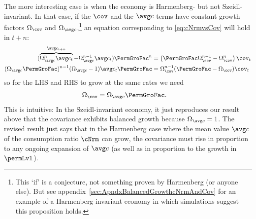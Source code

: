 \documentclass[BufferStockTheory]{subfiles}
\begin{document}
The more interesting case is when the economy is Harmenberg- but not Szeidl-invariant.
In that case, if the $\cov$ and the $\cNrmAvg$ terms have constant growth factors $\GroFac_{\cov}$ and $\GroFac_{\cNrmAvg}$,\footnote{This `if' is a conjecture, not something proven by Harmenberg (or anyone else).
But see appendix~\ref{sec:ApndxBalancedGrowthcNrmAndCov} for an example of a Harmenberg-invariant economy in which simulations suggest this proposition holds.} an equation corresponding to \eqref{eq:cNrmvsCov} will hold in $t+n$:
\begin{equation} \label{eq:aNrmGrovsCovGronm1}
  \begin{aligned}
    (\overbrace{\GroFac_{\cNrmAvg}^{n}\cNrmAvg_{t}}^{\cNrmAvg_{t+n}}-\GroFac^{n-1}_{\cNrmAvg}\cNrmAvg_{t})\PermGroFac^{n} & = \left(\PermGroFac\GroFac_{\cov}^{n-1} -\GroFac_{\cov}^{n}\right)\cov_{t}
    \\ (\GroFac_{\cNrmAvg}\PermGroFac)^{n-1} (\GroFac_{\cNrmAvg}-1)\cNrmAvg_{t}\PermGroFac & = \GroFac_{\cov}^{n-1}(\PermGroFac - \GroFac_{\cov}) \cov_{t}
  \end{aligned}
\end{equation}
so for the LHS and RHS to grow at the same rates we need
\begin{equation}\begin{gathered}\begin{aligned}
  \GroFac_{\cov}  & = \GroFac_{\cNrmAvg}\PermGroFac \label{eq:aNrmGrovscovGro}.
\end{aligned}\end{gathered}\end{equation}
This is intuitive:  In the Szeidl-invariant economy, it just reproduces our result above that the covariance exhibits balanced growth because $\GroFac_{\cNrmAvg}=1$.
The revised result just says that in the Harmenberg case where the mean value $\cNrmAvg$ of the consumption ratio $\cNrm$ can grow, the covariance must rise in proportion to any ongoing expansion of $\cNrmAvg$ (as well as in proportion to the growth in $\permLvl$).
\end{document}
